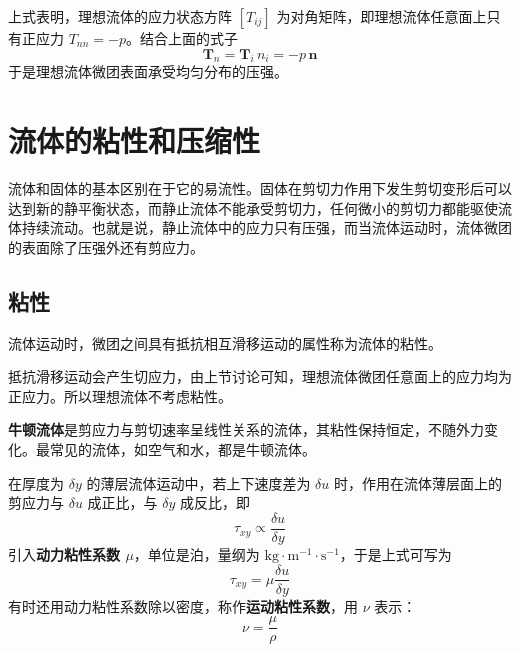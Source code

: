 上式表明，理想流体的应力状态方阵 $[T_{ij}]$ 为对角矩阵，即理想流体任意面上只有正应力 $T_{nn}=-p$。结合上面的式子
\begin{equation}\label{eq:ideal-fluid-stress-n}
	\boldsymbol{T}_n=\boldsymbol{T}_i\,n_i=-p\,\boldsymbol{n}
\end{equation}
于是理想流体微团表面承受均匀分布的压强。

\section{流体的粘性和压缩性}

流体和固体的基本区别在于它的易流性。固体在剪切力作用下发生剪切变形后可以达到新的静平衡状态，而静止流体不能承受剪切力，任何微小的剪切力都能驱使流体持续流动。也就是说，静止流体中的应力只有压强，而当流体运动时，流体微团的表面除了压强外还有剪应力。

\subsection{粘性}

\begin{definition}[粘性]
	流体运动时，微团之间具有抵抗相互滑移运动的属性称为流体的粘性。
\end{definition}

\begin{note}
	抵抗滑移运动会产生切应力，由上节讨论可知，理想流体微团任意面上的应力均为正应力。所以理想流体不考虑粘性。
\end{note}

\begin{definition}[牛顿流体]
	\textbf{牛顿流体}是剪应力与剪切速率呈线性关系的流体，其粘性保持恒定，不随外力变化。最常见的流体，如空气和水，都是牛顿流体。
\end{definition}

\begin{property}[牛顿流体的粘性]
	在厚度为 $\delta y$ 的薄层流体运动中，若上下速度差为 $\delta u$ 时，作用在流体薄层面上的剪应力与 $\delta u$ 成正比，与 $\delta y$ 成反比，即
	\begin{equation}\label{eq:newton-viscosity-proportional}
		\tau_{xy}\propto\frac{\delta u}{\delta y}
	\end{equation}
	引入\textbf{动力粘性系数 $\mu$}，单位是泊，量纲为 $\mathrm{kg\cdot m^{-1}\cdot s^{-1}}$，于是上式可写为
	\begin{equation}\label{eq:newton-viscosity}
		\tau_{xy}=\mu\frac{\delta u}{\delta y}
	\end{equation}
	有时还用动力粘性系数除以密度，称作\textbf{运动粘性系数}，用 $\nu$ 表示：
	\begin{equation}\label{eq:kinematic-viscosity}
		\nu=\frac{\mu}{\rho}
	\end{equation}
\end{property}

